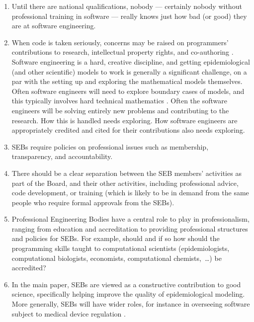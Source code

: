 \documentclass{article}
\begin{document}
\begin{enumerate}\raggedright
\item 
Until there are national qualifications, nobody --- certainly nobody without professional training in software --- really knows just how bad (or good) they are at software engineering.

\item
When code is taken seriously, concerns may be raised on programmers' contributions to research, intellectual property rights, and co-authoring \cite{vancouver}. Software engineering is a hard, creative discipline, and getting epidemiological (and other scientific) models to work is generally a significant challenge, on a par with the setting up and exploring the mathematical models themselves. Often software engineers will need to explore boundary cases of models, and this typically involves hard technical mathematics \cite{hamming}. Often the software engineers will be solving entirely new problems and contributing to the research. How this is handled needs exploring. How software engineers are appropriately credited and cited for their contributions also needs exploring.

\item 
SEBs require policies on professional issues such as membership, transparency, and accountability.
 
\item
There should be a clear separation between the SEB members' activities as part of the Board, and their other activities, including professional advice, code development, or training (which is likely to be in demand from the same people who require formal approvals from the SEBs).

\item
Professional Engineering Bodies have a central role to play in professionalism, ranging from education and accreditation to providing professional structures and policies for SEBs. For example, should and if so how should the programming skills taught to computational scientists (epidemiologists, computational biologists, economists, computational chemists,~\ldots\@) be accredited?

\item
In the main paper, SEBs are viewed as a constructive contribution to good science, specifically helping improve the quality of epidemiological modeling. More generally, SEBs will have wider roles, for instance in overseeing software subject to medical device regulation \cite{fixit}.


\end{enumerate}
\end{document}
